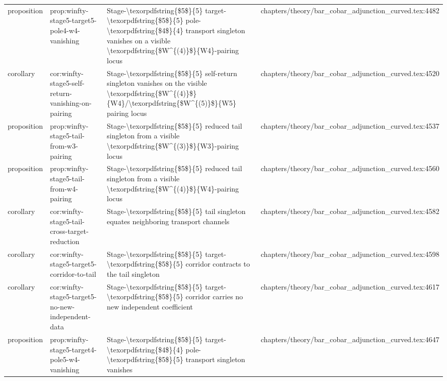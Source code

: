 \documentclass[11pt]{article}
\begin{document}
\begin{longtable}{L{0.10\textwidth}L{0.26\textwidth}L{0.42\textwidth}L{0.22\textwidth}}
proposition & prop:winfty-stage5-target5-pole4-w4-vanishing & Stage-\textbackslash{}texorpdfstring\{\$5\$\}\{5\} target-\textbackslash{}texorpdfstring\{\$5\$\}\{5\} pole-\textbackslash{}texorpdfstring\{\$4\$\}\{4\} transport singleton vanishes on a visible \textbackslash{}texorpdfstring\{\$W\textasciicircum{}\{(4)\}\$\}\{W4\}-pairing locus & chapters/theory/bar\_cobar\_adjunction\_curved.tex:4482\\
corollary & cor:winfty-stage5-self-return-vanishing-on-pairing & Stage-\textbackslash{}texorpdfstring\{\$5\$\}\{5\} self-return singleton vanishes on the visible \textbackslash{}texorpdfstring\{\$W\textasciicircum{}\{(4)\}\$\}\{W4\}/\textbackslash{}texorpdfstring\{\$W\textasciicircum{}\{(5)\}\$\}\{W5\} pairing locus & chapters/theory/bar\_cobar\_adjunction\_curved.tex:4520\\
proposition & prop:winfty-stage5-tail-from-w3-pairing & Stage-\textbackslash{}texorpdfstring\{\$5\$\}\{5\} reduced tail singleton from a visible \textbackslash{}texorpdfstring\{\$W\textasciicircum{}\{(3)\}\$\}\{W3\}-pairing locus & chapters/theory/bar\_cobar\_adjunction\_curved.tex:4537\\
proposition & prop:winfty-stage5-tail-from-w4-pairing & Stage-\textbackslash{}texorpdfstring\{\$5\$\}\{5\} reduced tail singleton from a visible \textbackslash{}texorpdfstring\{\$W\textasciicircum{}\{(4)\}\$\}\{W4\}-pairing locus & chapters/theory/bar\_cobar\_adjunction\_curved.tex:4560\\
corollary & cor:winfty-stage5-tail-cross-target-reduction & Stage-\textbackslash{}texorpdfstring\{\$5\$\}\{5\} tail singleton equates neighboring transport channels & chapters/theory/bar\_cobar\_adjunction\_curved.tex:4582\\
corollary & cor:winfty-stage5-target5-corridor-to-tail & Stage-\textbackslash{}texorpdfstring\{\$5\$\}\{5\} target-\textbackslash{}texorpdfstring\{\$5\$\}\{5\} corridor contracts to the tail singleton & chapters/theory/bar\_cobar\_adjunction\_curved.tex:4598\\
corollary & cor:winfty-stage5-target5-no-new-independent-data & Stage-\textbackslash{}texorpdfstring\{\$5\$\}\{5\} target-\textbackslash{}texorpdfstring\{\$5\$\}\{5\} corridor carries no new independent coefficient & chapters/theory/bar\_cobar\_adjunction\_curved.tex:4617\\
proposition & prop:winfty-stage5-target4-pole5-w4-vanishing & Stage-\textbackslash{}texorpdfstring\{\$5\$\}\{5\} target-\textbackslash{}texorpdfstring\{\$4\$\}\{4\} pole-\textbackslash{}texorpdfstring\{\$5\$\}\{5\} transport singleton vanishes & chapters/theory/bar\_cobar\_adjunction\_curved.tex:4647\\

\end{longtable}
\end{document}

